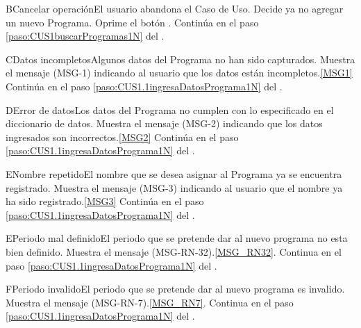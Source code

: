 	\begin{UCtrayectoriaA}{B}{Cancelar operaci\'on}{El usuario abandona el Caso de Uso.}
		\UCpaso[\UCactor] Decide ya no agregar un nuevo Programa.
		\UCpaso[\UCactor] Oprime el bot\'on .
			\UCpaso Contin\'ua en el paso \ref{paso:CUS1buscarProgramas1N} del .
	\end{UCtrayectoriaA}

	\begin{UCtrayectoriaA}{C}{Datos incompletos}{Algunos datos del Programa no han sido capturados.}
			\UCpaso Muestra el mensaje (MSG-1) indicando al usuario que los datos est\'an incompletos.\ref{MSG1}
			\UCpaso Contin\'ua en el paso \ref{paso:CUS1.1ingresaDatosPrograma1N} del .
	\end{UCtrayectoriaA}
		
	\begin{UCtrayectoriaA}{D}{Error de datos}{Los datos del Programa no cumplen con lo especificado en el diccionario de datos.}
			\UCpaso Muestra el mensaje (MSG-2) indicando que los datos ingresados son incorrectos.\ref{MSG2}
			\UCpaso Contin\'ua en el paso \ref{paso:CUS1.1ingresaDatosPrograma1N} del .
	\end{UCtrayectoriaA}

	\begin{UCtrayectoriaA}{E}{Nombre repetido}{El nombre que se desea asignar al Programa ya se encuentra registrado.}
			\UCpaso Muestra el mensaje (MSG-3) indicando al usuario que el nombre ya ha sido registrado.\ref{MSG3}
			\UCpaso Contin\'ua en el paso \ref{paso:CUS1.1ingresaDatosPrograma1N} del .
	\end{UCtrayectoriaA}

\begin{UCtrayectoriaA}{E}{Periodo mal definido}{El periodo que se pretende dar al nuevo programa no esta bien definido.}
		\UCpaso Muestra el mensaje (MSG-RN-32).\ref{MSG_RN32}.
		\UCpaso Continua en el paso \ref{paso:CUS1.1ingresaDatosPrograma1N} del .
	\end{UCtrayectoriaA}

	\begin{UCtrayectoriaA}{F}{Periodo invalido}{El periodo que se pretende dar al nuevo programa es invalido.}
		\UCpaso Muestra el mensaje (MSG-RN-7).\ref{MSG_RN7}.
		\UCpaso Continua en el paso \ref{paso:CUS1.1ingresaDatosPrograma1N} del .
	\end{UCtrayectoriaA}

